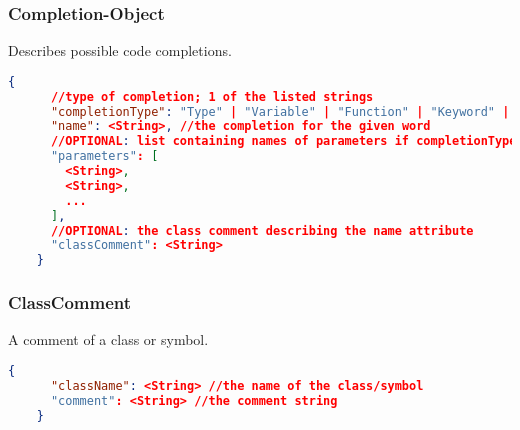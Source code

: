   \subsubsection{Completion-Object}
  Describes possible code completions.
  \begin{lstlisting}[basicstyle=\small,language=json]
    {
      //type of completion; 1 of the listed strings
      "completionType": "Type" | "Variable" | "Function" | "Keyword" | "Package" | "Model" | "Class",
      "name": <String>, //the completion for the given word
      //OPTIONAL: list containing names of parameters if completionType=function
      "parameters": [
        <String>,
        <String>,
        ...
      ],
      //OPTIONAL: the class comment describing the name attribute
      "classComment": <String>
    }
  \end{lstlisting}

  \subsubsection{ClassComment}
  A comment of a class or symbol.
  \begin{lstlisting}[basicstyle=\small,language=json]
    {
      "className": <String> //the name of the class/symbol
      "comment": <String> //the comment string
    }
  \end{lstlisting}
